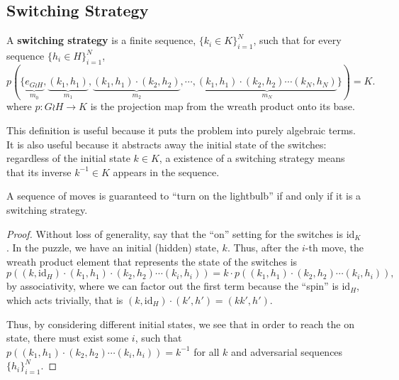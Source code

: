 \subsection{Switching Strategy}

\begin{definition}
  A \textbf{switching strategy} is a finite sequence, $\{k_i \in K\}_{i=1}^N$,
  such that for every sequence ${\{h_i \in H\}_{i=1}^N}$,
  \[
    p(\{
      \underbrace{e_{G \wr H}}_{m_0},
      \underbrace{(k_1, h_1)}_{m_1},
      \underbrace{(k_1, h_1)\cdot(k_2, h_2)}_{m_2},
      \cdots,
      \underbrace{(k_1, h_1)\cdot(k_2, h_2)\cdots(k_N, h_N)}_{m_N}
    \}) = K.
  \]
  where $p \colon G \wr H \rightarrow K$ is the projection map from the
  wreath product onto its base.
\end{definition}

This definition is useful because it puts the problem into purely algebraic
terms. It is also useful because it abstracts away the initial state of the
switches: regardless of the initial state $k \in K$, a existence of a switching strategy
means that its inverse $k^{-1} \in K$ appears in the sequence.


\begin{lemma}
  A sequence of moves is guaranteed to ``turn on the lightbulb'' if and only if
  it is a switching strategy.
\end{lemma}
\begin{proof}
  Without loss of generality, say that the ``on'' setting for the switches is
  $\mathrm{id}_K$.
  In the puzzle, we have an initial (hidden) state, $k$.
  Thus, after the $i$-th move, the wreath product
  element that represents the state of the switches is \[
    p\left((k, \mathrm{id}_H)\cdot(k_1, h_1)\cdot(k_2, h_2)\cdots(k_i, h_i)\right)
    = k \cdot p\left((k_1, h_1)\cdot(k_2, h_2)\cdots(k_i, h_i)\right),
  \] by associativity, where we can factor out the first term because
  the ``spin'' is $\mathrm{id}_H$, which acts trivially, that is
  $(k, \mathrm{id}_H) \cdot (k', h') = (kk', h').$

  Thus, by considering different initial states, we see that in order
  to reach the on state, there must exist some $i$, such that
  $p\left((k_1, h_1)\cdot(k_2, h_2)\cdots(k_i, h_i)\right) = k^{-1}$ for all
  $k$ and adversarial sequences $\{h_i\}_{i=1}^N$.
\end{proof}

